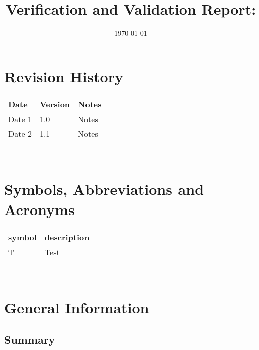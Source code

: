 \documentclass[12pt, titlepage]{article}
\begin{document}
\title{Verification and Validation Report: \progname} 
\author{\authname}
\date{\today}
	
\maketitle


\section{Revision History}

\begin{tabularx}{\textwidth}{p{3cm}p{2cm}X}
\toprule {\bf Date} & {\bf Version} & {\bf Notes}\\
\midrule
Date 1 & 1.0 & Notes\\
Date 2 & 1.1 & Notes\\
\bottomrule
\end{tabularx}

~\newpage

\section{Symbols, Abbreviations and Acronyms}

\renewcommand{\arraystretch}{1.2}
\begin{tabular}{l l} 
  \toprule		
  \textbf{symbol} & \textbf{description}\\
  \midrule 
  T & Test\\
  \bottomrule
\end{tabular}\\


\newpage

\tableofcontents

\listoftables %

\listoffigures %

\newpage


\setlength\parindent{0pt}
\section{\textbf{General Information}}

\subsection{Summary}
\end{document}

